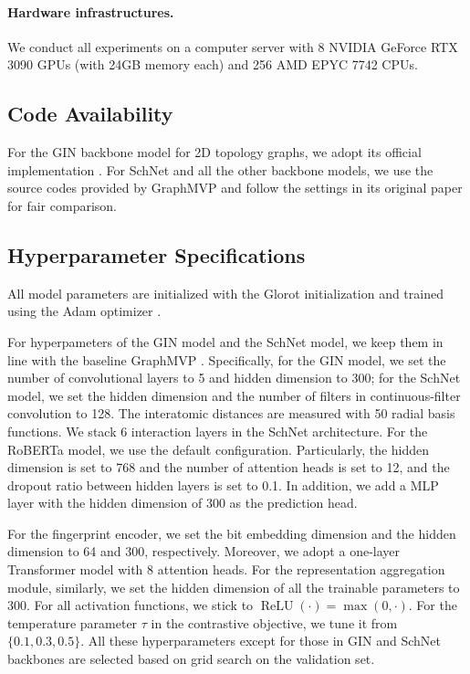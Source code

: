 \paragraph{Hardware infrastructures.} 
We conduct all experiments on a computer server with 8 NVIDIA GeForce RTX 3090 GPUs (with 24GB memory each) and 256 AMD EPYC 7742 CPUs.

\subsection{Code Availability}
For the GIN backbone model for 2D topology graphs, we adopt its official implementation \cite{Hu:2020uz}.
For SchNet and all the other backbone models, we use the source codes provided by GraphMVP \cite{Liu:2022vr} and follow the settings in its original paper for fair comparison.

\subsection{Hyperparameter Specifications}
All model parameters are initialized with the Glorot initialization \cite{Glorot:2010uc} and trained using the Adam optimizer \cite{Kingma:2015us}.

For hyperpameters of the GIN model and the SchNet model, we keep them in line with the baseline GraphMVP \cite{Liu:2022vr}. Specifically, for the GIN model, we set the number of convolutional layers to 5 and hidden dimension to 300;
for the SchNet model, we set the hidden dimension and the number of filters in continuous-filter convolution to 128. The interatomic distances are measured with 50 radial basis functions. We stack 6 interaction layers in the SchNet architecture.
For the RoBERTa model, we use the default configuration. Particularly, the hidden dimension is set to 768 and the number of attention heads is set to 12, and the dropout ratio between hidden layers is set to 0.1.
In addition, we add a MLP layer with the hidden dimension of 300 as the prediction head.  

For the fingerprint encoder, we set the bit embedding dimension and the hidden dimension to 64 and 300, respectively. Moreover, we adopt a one-layer Transformer model with 8 attention heads.
For the representation aggregation module, similarly, we set the hidden dimension of all the trainable parameters to 300.
For all activation functions, we stick to \(\operatorname{ReLU}(\cdot) = \max(0, \cdot)\).
For the temperature parameter \(\tau\) in the contrastive objective, we tune it from \(\{0.1, 0.3, 0.5\}\).
All these hyperparameters except for those in GIN and SchNet backbones are selected based on grid search on the validation set.

